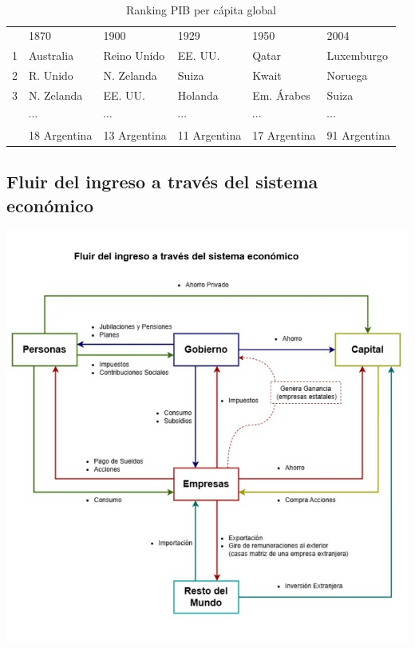 \vspace{.5cm}
\begin{table}[H]
    \centering
    \caption{\\Ranking PIB per cápita global}
    \begin{tabular}{rlllll}
        \hline
          & 1870         & 1900         & 1929         & 1950         & 2004         \\
        1 & Australia    & Reino Unido  & EE. UU.      & Qatar        & Luxemburgo   \\
        2 & R. Unido     & N. Zelanda   & Suiza        & Kwait        & Noruega      \\
        3 & N. Zelanda   & EE. UU.      & Holanda      & Em. Árabes   & Suiza        \\
          & \(\cdots\)   & \(\cdots\)   & \(\cdots\)   & \(\cdots\)   & \(\cdots\)   \\
          & 18 Argentina & 13 Argentina & 11 Argentina & 17 Argentina & 91 Argentina \\
        \hline
    \end{tabular}
\end{table}
\vspace{.5cm}

\subsection{Fluir del ingreso a través del sistema económico}

\includegraphics[width=\textwidth]{img/flujo-del-ingreso.jpeg}